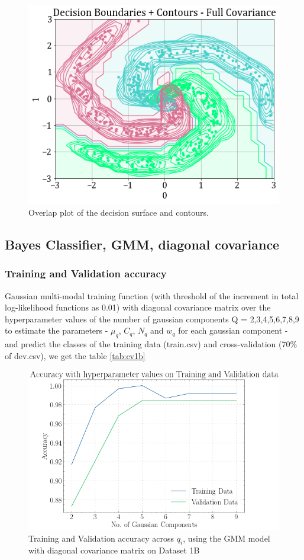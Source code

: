 \documentclass[11pt,a4paper]{article}
\begin{document}
\begin{figure}[H]
    \centering
    \includegraphics[scale=0.45]{images/1b_full_ds_contours.png}
    \caption{Overlap plot of the decision surface and contours.}
\end{figure}

\subsection{Bayes Classifier, GMM, diagonal covariance}
\subsubsection{Training and Validation accuracy}
Gaussian multi-modal training function (with threshold of the increment in total log-likelihood functions as 0.01) with diagonal covariance matrix over the hyperparameter values of the number of gaussian components Q = {2,3,4,5,6,7,8,9} to estimate the parameters - $\mu_q$, $C_q$, $N_q$ and $w_q$ for each gaussian component - and predict the classes of the training data (train.csv) and cross-validation (70\% of dev.csv), we get the table \ref{tab:cv1b}

\begin{figure}[H]
    \centering
    \includegraphics[scale=0.5]{images/acc_1b.png}
    \caption{Training and Validation accuracy across $q_i$, using the GMM model with diagonal covariance matrix on Dataset 1B}
    \label{fig:acc1bGMMdiag}
\end{figure}
\end{document}
